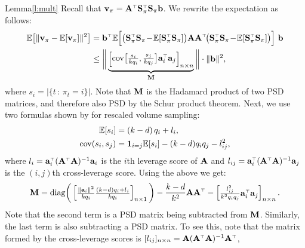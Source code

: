 \documentclass[12pt]{sty/colt2019/colt2018-arxiv}
\begin{document}
\begin{proofof}{Lemma}{\ref{l:mult}}
Recall that $\v_\pi = \A^\top\S_\pi^\top\S_\pi\b$.  We rewrite the expectation as follows:
\begin{align*}
  \E\big[\|\v_\pi-\E[\v_\pi]\|^2\big]
  &=\b^\top\E\Big[
    \big(\S_{\pi}^\top\S_{\pi}\!-\!\E[\S_{\pi}^\top\S_{\pi}]\big)\A\A^\top\!
    \big(\S_{\pi}^\top\S_{\pi}\!-\! \E[\S_{\pi}^\top\S_{\pi}]\big)\Big]\ \b\\
  &\le \bigg\|\underbrace{
    \begin{bmatrix}\cov\big[\frac{s_i}{kq_i},\frac{s_j}{kq_j}\big]\a_i^\top\a_j\end{bmatrix}_{n\times n}}_{\M}\bigg\|\cdot\|\b\|^2,
\end{align*}
where $s_i=|\{t\,:\,\pi_t=i\}|$.
Note that $\mathbf M$ is the Hadamard product of two PSD matrices, and therefore also PSD
by the Schur product theorem.
Next, we use two formulas
shown by \cite{leveraged-volume-sampling} for rescaled volume sampling:
\begin{align}
  \mathbb E[s_i] &=(k-d)\,q_i+l_i,\label{eq:marginal}\\
  \mathrm{cov}(s_i,s_j)&=\mathbf 1_{i=j}\mathbb E[s_i] - (k-d)q_iq_j - l_{ij}^2,\nonumber
\end{align}
where $l_i=\a_i^\top(\A^\top\A)^{-1}\a_i$ is the $i$th leverage score
of $\mathbf A$ and $l_{ij}=\a_i^\top(\A^\top\A)^{-1}\a_j$ is the $(i,j)$th 
cross-leverage score. Using the above we get:
\begin{align*}
  \M = \text{diag}\bigg(\begin{bmatrix}\frac{\|\a_i\|^2}{kq_i}\frac{(k-d)q_i+l_i}{kq_i}\end{bmatrix}_{n\times 1}\bigg) -
  \frac{k-d}{k^2}\A\A^\top
      - \begin{bmatrix}\frac{l_{ij}^2}{k^2q_iq_j}\a_i^\top\a_j\end{bmatrix}_{n\times n}.
\end{align*}
Note that the second term is a PSD matrix being subtracted from
$\mathbf M$.
Similarly, the last term is also
subtracting a PSD matrix. To see this, note that the matrix
formed by the cross-leverage scores is $[l_{ij}]_{n\times n}=\A(\A^\top\A)^{-1}\A^\top$,

\end{proofof}
\end{document}
